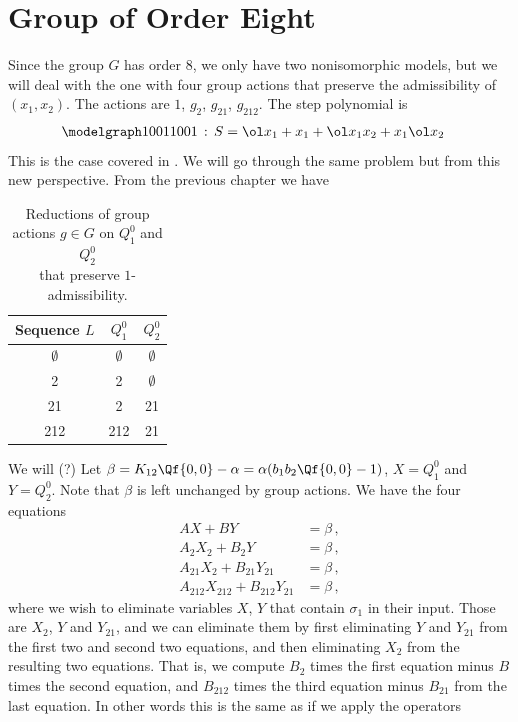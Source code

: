 \section{Group of Order Eight}
Since the group $G$ has order 8, we only have two nonisomorphic models, but we will deal with the one with four group actions that preserve the admissibility of $(x_1,x_2)$. The actions are $1$, $ g_2$, $ g_{21}$, $ g_{212}$. The step polynomial is
\begin{align}
	\modelgraph 10011001 \,:\,S &= \ol x_1+x_1+\ol x_1x_2+x_1\ol x_2
\end{align}
This is the case covered in \cite{tabbara2014exact}. We will go through the same problem but from this new perspective. From the previous chapter we have
\begin{table}[H]
\caption{Reductions of group actions $g \in G$ on $Q_1^0$ and $Q_2^0$\\that preserve $1$-admissibility.}
\label{tbl:tableG6}
\centering
\begin{tabular}{ccc}
\toprule
	Sequence $L$ & $Q_1^0$ & $Q_2^0$ \\ 
\midrule
	$\emptyset$ & $\emptyset$ & $\emptyset$ \\
	2 &  2& $\emptyset$ \\
	21 &  2 & 21   \\
	212 &  212 & 21  \\
\bottomrule
\end{tabular}
\end{table}
We will (?)
Let $\beta = K_{12}\Qf{0,0} - \alpha = \alpha(b_1b_2\Qf{0,0}-1)$, $X = Q_1^0$ and $Y = Q_2^0$. Note that $\beta$ is left unchanged by group actions. We have the four equations
\begin{align}
	AX+BY&= \beta\,, \\
	A_2 X_2 + B_2 Y &=\beta\,,\\
	A_{21}X_2+ B_{21}Y_{21} &= \beta\,, \\
	A_{212} X_{212} + B_{212} Y_{21}&= \beta\,,
\end{align}
where we wish to eliminate variables $X$, $Y$ that contain $\sigma_1$ in their input. Those are $X_2$, $Y$ and $Y_{21}$, and we can eliminate them by first eliminating $Y$ and $Y_{21}$ from the first two and second two equations, and then eliminating $X_2$ from the resulting two equations. That is, we compute $B_2$ times the first equation minus $B$ times the second equation, and $B_{212}$ times the third equation minus $B_{21}$ from the last equation. In other words this is the same as if we apply the operators
